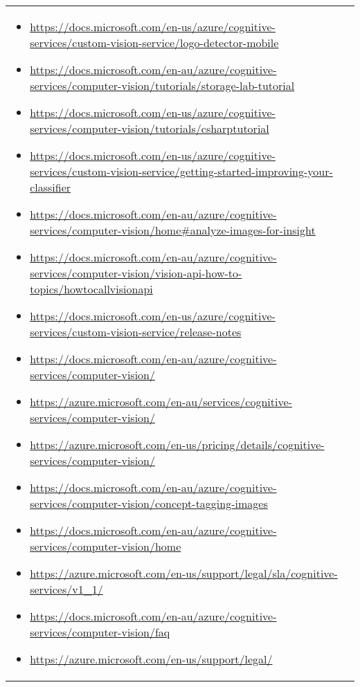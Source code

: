 {\begin{longtable}{p{.2\linewidth}|p{.725\linewidth}}
\begin{itemize}[label=,leftmargin=10pt,topsep=0pt,partopsep=0pt,noitemsep,nolistsep,itemindent=-10pt]
\item \url{https://docs.microsoft.com/en-us/azure/cognitive-services/custom-vision-service/logo-detector-mobile}
\item \url{https://docs.microsoft.com/en-au/azure/cognitive-services/computer-vision/tutorials/storage-lab-tutorial}
\item \url{https://docs.microsoft.com/en-us/azure/cognitive-services/computer-vision/tutorials/csharptutorial}
\item \url{https://docs.microsoft.com/en-us/azure/cognitive-services/custom-vision-service/getting-started-improving-your-classifier}
\item \url{https://docs.microsoft.com/en-au/azure/cognitive-services/computer-vision/home#analyze-images-for-insight}
\item \url{https://docs.microsoft.com/en-au/azure/cognitive-services/computer-vision/vision-api-how-to-topics/howtocallvisionapi}
\item \url{https://docs.microsoft.com/en-us/azure/cognitive-services/custom-vision-service/release-notes}
\item \url{https://docs.microsoft.com/en-au/azure/cognitive-services/computer-vision/}
\item \url{https://azure.microsoft.com/en-au/services/cognitive-services/computer-vision/}
\item \url{https://azure.microsoft.com/en-us/pricing/details/cognitive-services/computer-vision/}
\item \url{https://docs.microsoft.com/en-au/azure/cognitive-services/computer-vision/concept-tagging-images}
\item \url{https://docs.microsoft.com/en-au/azure/cognitive-services/computer-vision/home}
\item \url{https://azure.microsoft.com/en-us/support/legal/sla/cognitive-services/v1_1/}
\item \url{https://docs.microsoft.com/en-au/azure/cognitive-services/computer-vision/faq}
\item \url{https://azure.microsoft.com/en-us/support/legal/}
    \end{itemize}\\
\end{longtable}}


